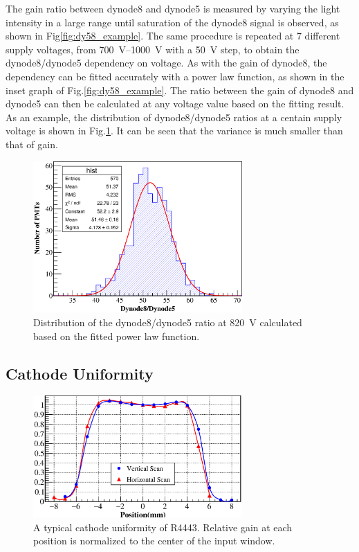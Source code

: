 \documentclass[5p, times]{elsarticle}
\begin{document}
The gain ratio between dynode8 and dynode5 is measured by varying the light intensity in a large range until saturation of the dynode8 signal is observed, as shown in Fig\ref{fig:dy58_example}.
The same procedure is repeated at 7 different supply voltages, from \SIrange{700}{1000}{\volt} with a \SI{50}{\volt} step, to obtain the dynode8/dynode5 dependency on voltage.
As with the gain of dynode8, the dependency can be fitted accurately with a power law function, as shown in the inset graph of Fig.\ref{fig:dy58_example}.
The ratio between the gain of dynode8 and dynode5 can then be calculated at any voltage value based on the fitting result.
As an example, the distribution of dynode8/dynode5 ratios at a centain supply voltage is shown in Fig.\ref{fig:dy58_dist}.
It can be seen that the variance is much smaller than that of gain.

\begin{figure}
 \centering
 \includegraphics[width=80mm]{dy58_dist}
\caption{Distribution of the dynode8/dynode5 ratio at \SI{820}{\volt} calculated based on the fitted power law function.}
\label{fig:dy58_dist}
\end{figure} 

\subsection{Cathode Uniformity}
\label{sec:psd_cathodescan}

\begin{figure}
 \centering
 \includegraphics[width=80mm]{cathode_uniformity}
\caption{A typical cathode uniformity of R4443.
Relative gain at each position is normalized to the center of the input window.}
\label{fig:cathode_uniformity}
\end{figure} 
\end{document}
